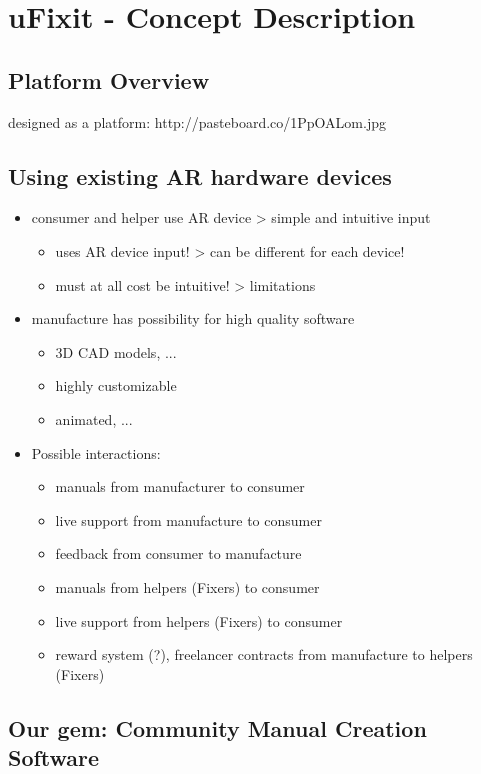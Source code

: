 
\chapter{uFixit - Concept Description}

	\section{Platform Overview}
	
		designed as a platform: http://pasteboard.co/1PpOALom.jpg
	
	\section{Using existing AR hardware devices}
	
		\begin{itemize}
			\itemsep0em
			\item consumer and helper use AR device > simple and intuitive input \begin{itemize}
				\itemsep0em
				\item uses AR device input! > can be different for each device!
				\item must at all cost be intuitive! > limitations
			\end{itemize}
			\item manufacture has possibility for high quality software \begin{itemize}
				\itemsep0em
				\item 3D CAD models, ...
				\item highly customizable
				\item animated, ...
			\end{itemize}
			\item Possible interactions: \begin{itemize}
				\itemsep0em
				\item manuals from manufacturer to consumer
				\item live support from manufacture to consumer
				\item feedback from consumer to manufacture
				\item manuals from helpers (Fixers) to consumer
				\item live support from helpers (Fixers) to consumer
				\item reward system (?), freelancer contracts from manufacture to helpers (Fixers)
			\end{itemize}
		\end{itemize}
		
	\section{Our gem: Community Manual Creation Software}